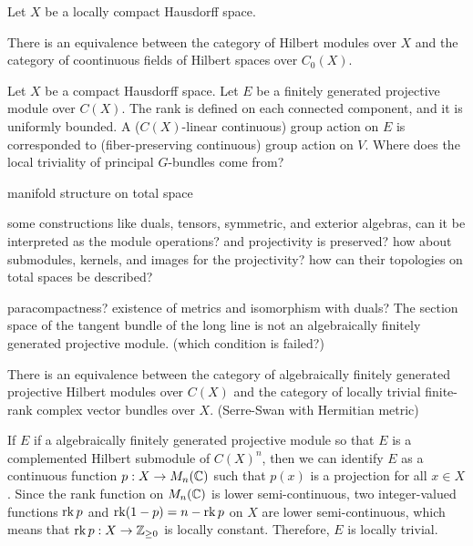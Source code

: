 \documentclass{../../large}
\begin{document}
\begin{prb}
Let $X$ be a locally compact Hausdorff space.






\begin{parts}
\item There is an equivalence between the category of Hilbert modules over $X$ and the category of coontinuous fields of Hilbert spaces over $C_0(X)$.
\end{parts}
\end{prb}


\begin{prb}
Let $X$ be a compact Hausdorff space.
Let $E$ be a finitely generated projective module over $C(X)$.
The rank is defined on each connected component, and it is uniformly bounded.
A ($C(X)$-linear continuous) group action on $E$ is corresponded to (fiber-preserving continuous) group action on $V$.
Where does the local triviality of principal $G$-bundles come from?


manifold structure on total space

some constructions like duals, tensors, symmetric, and exterior algebras, can it be interpreted as the module operations? and projectivity is preserved?
how about submodules, kernels, and images for the projectivity? how can their topologies on total spaces be described?

paracompactness? existence of metrics and isomorphism with duals? The section space of the tangent bundle of the long line is not an algebraically finitely generated projective module. (which condition is failed?)

\begin{parts}
\item There is an equivalence between the category of algebraically finitely generated projective Hilbert modules over $C(X)$ and the category of locally trivial finite-rank complex vector bundles over $X$. (Serre-Swan with Hermitian metric)
\end{parts}
\end{prb}

\begin{pf}
If $E$ if a algebraically finitely generated projective module so that $E$ is a complemented Hilbert submodule of $C(X)^n$, then we can identify $E$ as a continuous function $p:X\to M_n(\mathbb{C})$ such that $p(x)$ is a projection for all $x\in X$.
Since the rank function on $M_n(\mathbb{C})$ is lower semi-continuous, two integer-valued functions $\operatorname{rk} p$ and $\operatorname{rk}(1-p)=n-\operatorname{rk} p$ on $X$ are lower semi-continuous, which means that $\operatorname{rk} p:X\to\mathbb{Z}_{\ge0}$ is locally constant.
Therefore, $E$ is locally trivial.

\end{pf}
\end{document}

